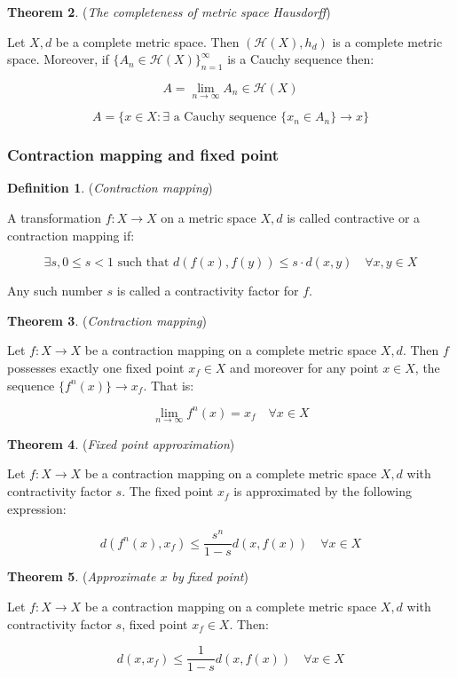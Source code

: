 \textbf{Theorem 2}. (\textit{The completeness of metric space Hausdorff})

Let \(X, d\) be a complete metric space. Then \((\mathcal{H}(X), h_d)\) is a complete metric space. Moreover, if \(\{A_n \in \mathcal{H}(X)\}_{n=1}^\infty\) is a Cauchy sequence then:

\[
A = \lim_{n \to \infty} A_n \in \mathcal{H}(X)
\]

\[
A = \{x \in X : \exists \text{ a Cauchy sequence } \{x_n \in A_n\} \rightarrow x\}
\]

\pagebreak
\subsubsection{Contraction mapping and fixed point}

\textbf{Definition 1}. (\textit{Contraction mapping})

A transformation \(f: X \rightarrow X\) on a metric space \(X, d\) is called contractive or a contraction mapping if:

\[
\exists s, 0 \leq s < 1 \text{ such that } d(f(x), f(y)) \leq s \cdot d(x, y) \quad \forall x, y \in X
\]

Any such number \(s\) is called a contractivity factor for \(f\).

\textbf{Theorem 3}. (\textit{Contraction mapping})

Let \(f: X \rightarrow X\) be a contraction mapping on a complete metric space \(X, d\). Then \(f\) possesses exactly one fixed point \(x_f \in X\) and moreover for any point \(x \in X\), the sequence \(\{f^n(x)\} \rightarrow x_f\). That is:

\[
\lim_{n \to \infty} f^n(x) = x_f \quad \forall x \in X
\]

\textbf{Theorem 4}. (\textit{Fixed point approximation})

Let \(f: X \rightarrow X\) be a contraction mapping on a complete metric space \(X, d\) with contractivity factor \(s\). The fixed point \(x_f\) is approximated by the following expression:

\[
d(f^n(x), x_f) \leq \frac{s^n}{1 - s} d(x, f(x)) \quad \forall x \in X
\]

\textbf{Theorem 5}. (\textit{Approximate \(x\) by fixed point})

Let \(f: X \rightarrow X\) be a contraction mapping on a complete metric space \(X, d\) with contractivity factor \(s\), fixed point \(x_f \in X\). Then:

\[
d(x, x_f) \leq \frac{1}{1 - s} d(x, f(x)) \quad \forall x \in X
\]

